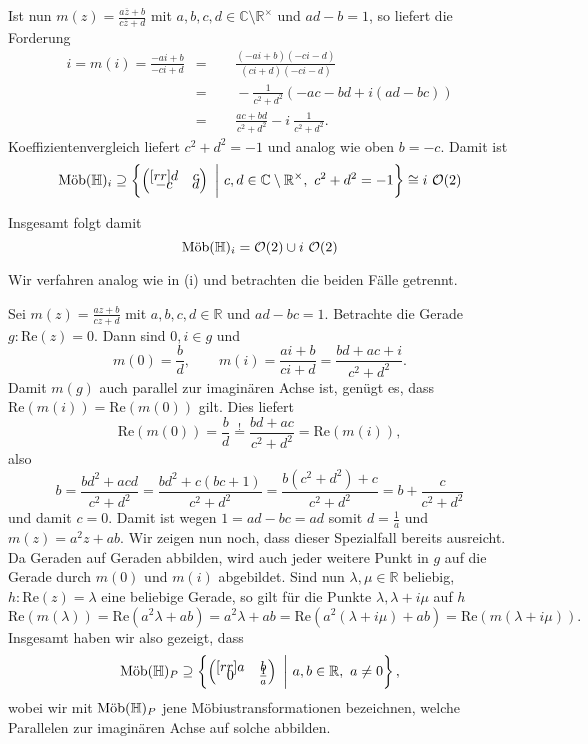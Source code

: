 \documentclass[11pt]{book}
\numberwithin{dummy}{section}
\theoremstyle{nonumberbreak}
\newenvironment{prob}[1][]{\ifthenelse{\equal{#1}{}}{\problem}{\problem[#1]}\rm}{\endproblem}
\newenvironment{sol}[1][]{\ifthenelse{\equal{#1}{}}{\solution}{\solution[#1]}\rm}{\endsolution}
\newcommand{\C}{\mathbb{C}}
\newcommand{\R}{\mathbb{R}}
\newcommand{\He}{\mathbb{H}}
\newcommand{\amob}{\textup{Möb}}
\newcommand{\matx}[4]{\begin{pmatrix}[rr]#1 & #2 \\[-6pt] #3 & #4 \end{pmatrix}}
\begin{document}
\begin{spacing}{1.4}
\begin{prob}
\begin{sol}
\begin{compactenum}
\begin{compactenum}
\item Ist nun $m(z)= \frac{a\overline{z}+b}{c\overline{z}+d}$ mit $a,b,c,d \in \C \setminus \R^{\times}$ und $ad-b=1$, so liefert die Forderung
\begin{alignat*}{5}
i=m(i)=\frac{-ai+b}{-ci+d} &=&& \ \  \frac{(-ai+b)(-ci-d)}{(ci+d)(-ci-d)}\\  &=&& \ \  -\frac{1}{c^2+d^2} \left( -ac-bd + i(ad-bc)\right) \\ &=&& \ \  \frac{ac+bd}{c^2+d^2} - i \ \frac{1}{c^2+d^2}.
\end{alignat*}
Koeffizientenvergleich liefert $c^2+d^2=-1$ und analog wie oben $b=-c$. Damit ist 
$$\amob(\He)_i\supseteq \left\{ \matx{d}{c}{-c}{d} \ \bigg\vert \ c,d \in \C \setminus \R^{\times}, \ c^2+d^2=-1 \right\} \cong i\ \mathcal{O}(2)$$
\end{compactenum}
Insgesamt folgt damit
$$\amob(\He)_i= \mathcal{O}(2) \cup i\ \mathcal{O}(2)$$

\item Wir verfahren analog wie in (i) und betrachten die beiden Fälle getrennt.
\begin{compactenum} 
\item Sei $m(z)=\frac{az+b}{cz+d}$ mit $a,b,c,d \in \R$ und $ad-bc=1$. Betrachte die Gerade $g: \mathrm{Re}(z)=0$. Dann sind $0,i \in g$ und 
$$m(0)=\frac{b}{d}, \qquad m(i)= \frac{ai+b}{ci+d} = \frac{bd+ac+i}{c^2+d^2}.$$
Damit $m(g)$ auch parallel zur imaginären Achse ist, genügt es, dass $\mathrm{Re}(m(i))= \mathrm{Re}(m(0))$ gilt. Dies liefert
$$\mathrm{Re}(m(0))=\frac{b}{d}\overset{!}{=} \frac{bd+ac}{c^2+d^2} = \mathrm{Re}(m(i)),$$
also 
$$b=\frac{bd^2+acd}{c^2+d^2} = \frac{bd^2+c(bc+1)}{c^2+d^2} = \frac{b(c^2+d^2)+c}{c^2+d^2} = b + \frac{c}{c^2+d^2}$$
und damit $c=0$. Damit ist wegen $1=ad-bc=ad$ somit $d=\frac{1}{a}$ und $m(z)=a^2z+ab$. Wir zeigen nun noch, dass dieser Spezialfall bereits ausreicht. Da Geraden auf Geraden abbilden, wird auch jeder weitere Punkt in $g$ auf die Gerade durch $m(0)$ und $m(i)$ abgebildet. Sind nun $\lambda, \mu \in\R$ beliebig, $h: \mathrm{Re}(z)=\lambda$ eine beliebige Gerade, so gilt für die Punkte $\lambda, \lambda + i \mu$ auf $h$
$$\mathrm{Re}(m(\lambda))=\mathrm{Re}(a^2\lambda + ab)=a^2\lambda + ab = \mathrm{Re}(a^2(\lambda + i \mu) + ab) =\mathrm{Re}(m(\lambda + i \mu)).$$
Insgesamt haben wir also gezeigt, dass
$$\amob(\He)_P \supseteq \left\{ \matx{a}{b}{0}{\frac{1}{a}} \ \bigg \vert \ a,b \in \R, \ a \neq 0 \right\},$$
wobei wir mit $\amob(\He)_P$ jene Möbiustransformationen bezeichnen, welche Parallelen zur imaginären Achse auf solche abbilden.


\end{compactenum}
\end{compactenum}
\end{sol}
\end{prob}
\end{spacing}
\end{document}
